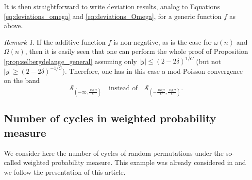 \documentclass[12pt,a4paper,reqno]{amsart}
\theoremstyle{remark}
\newtheorem{remark}[lemma]{Remark}
\begin{document}
\noindent It is then straightforward to write deviation results, analog to Equations \eqref{eq:deviations_omega} and \eqref{eq:deviations_Omega}, for a generic function $f$ as above.
\medskip

\begin{remark}
If the additive function $f$ is non-negative, as is the case for $\omega(n)$ and $\Omega(n)$, then it is easily seen that one can perform the whole proof of Proposition \ref{prop:selbergdelange_general} assuming only $|y| \leq (2-2\delta)^{1/C}$ (but not $|y| \geq (2-2\delta)^{-1/C}$). Therefore, one has in this case a mod-Poisson convergence on the band $$\mathcal{S}_{(-\infty,\frac{\log 2}{C})}\quad \text{instead of}\quad \mathcal{S}_{(-\frac{\log 2}{C},\frac{\log 2}{C})}.$$
\end{remark}
\bigskip



\subsection{Number of cycles in weighted probability measure}
\label{subsec:cycles}
We consider here the number of cycles of random permutations under the so-called weighted probability measure.
This example was already considered in \cite{NZ13} and we follow the presentation of this article.
\bigskip
\end{document}
